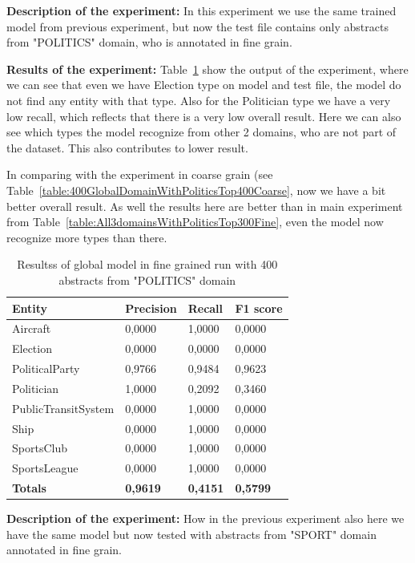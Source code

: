 \documentclass[thesis=M,english]{FITthesis}[2018/05/30]
\begin{document}
\textbf{Description of the experiment:} In this experiment we use the same trained model from previous experiment, but now the test file contains only abstracts from "POLITICS" domain, who is annotated in fine grain.

\textbf{Results of the experiment:} Table~\ref{table:400GlobalDomainWithPoliticsTop400Fine} show the output of the experiment, where we can see that even we have Election type on model and test file, the model do not find any entity with that type. Also for the Politician type we have a very low recall, which reflects that there is a very low overall result. Here we can also see which types the model recognize from other 2 domains, who are not part of the dataset. This also contributes to lower result.

In comparing with the experiment in coarse grain (see Table~\ref{table:400GlobalDomainWithPoliticsTop400Coarse}, now we have a bit better overall result. As well the results here are better than in main experiment from Table~\ref{table:All3domainsWithPoliticsTop300Fine}, even the model now recognize more types than there.

	\begin{table}[H]\centering
		\begin{tabular}{|l|l|l|l|}
			\hline {\textbf{Entity}} & {\textbf{Precision}} & {\textbf{Recall}} & {\textbf{F1 score}}\\\hline
				Aircraft & 0,0000 & 1,0000 & 0,0000\\				
				Election & 0,0000 & 0,0000 & 0,0000\\
				PoliticalParty & 0,9766 & 0,9484 & 0,9623\\
				Politician & 1,0000 & 0,2092 & 0,3460\\
				PublicTransitSystem & 0,0000 & 1,0000 & 0,0000\\
				Ship & 0,0000 & 1,0000 & 0,0000\\
				SportsClub & 0,0000 & 1,0000 & 0,0000\\
				SportsLeague & 0,0000 & 1,0000 & 0,0000\\\hline
				\textbf{Totals} & \textbf{0,9619} & \textbf{0,4151} & \textbf{0,5799}\\\hline
		\end{tabular}
		\caption{Resultss of global model in fine grained run with 400 abstracts from "POLITICS" domain \label{table:400GlobalDomainWithPoliticsTop400Fine}}
	\end{table}	

\textbf{Description of the experiment:} How in the previous experiment also here we have the same model but now tested with abstracts from "SPORT" domain annotated in fine grain.
\end{document}
